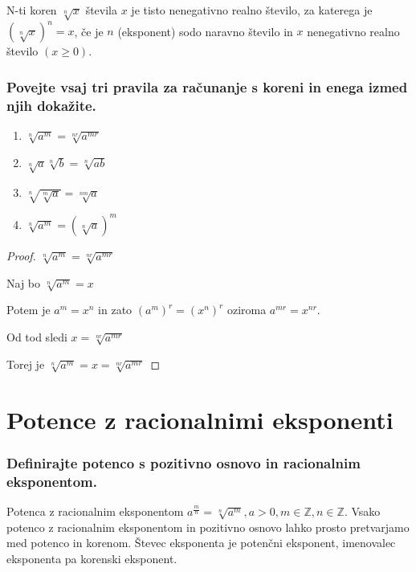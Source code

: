 \documentclass{article}
\begin{document}
N-ti koren $\sqrt[n]{x}$ števila $x$ je tisto nenegativno realno število, za katerega je $(\sqrt[n]{x})^{n}=x$, če je $n$ (eksponent) sodo naravno število in $x$ nenegativno realno število $(x \geq 0)$.

\subsubsection*{Povejte vsaj tri pravila za računanje s koreni in enega izmed njih dokažite.}

\begin{enumerate}
  \item $\sqrt[n]{a^{m}}=\sqrt[n r]{a^{m r}}$

  \item $\sqrt[n]{a} \sqrt[n]{b}=\sqrt[n]{a b}$

  \item $\sqrt[n]{\sqrt[m]{a}}=\sqrt[n m]{a}$

  \item $\sqrt[n]{a^{m}}=(\sqrt[n]{a})^{m}$

\end{enumerate}

\begin{proof}
    $\sqrt[n]{a^{m}}=\sqrt[n r]{a^{m r}}$

Naj bo $\sqrt[n]{a^{m}}=x$

Potem je $a^{m}=x^{n}$ in zato $\left(a^{m}\right)^{r}=\left(x^{n}\right)^{r}$ oziroma $a^{m r}=x^{n r}$.

Od tod sledi $x=\sqrt[n r]{a^{m r}}$

Torej je $\sqrt[n]{a^{m}}=x=\sqrt[n r]{a^{m r}}$

\end{proof}

\section{Potence z racionalnimi eksponenti}
\subsubsection*{Definirajte potenco s pozitivno osnovo in racionalnim eksponentom.}

Potenca z racionalnim eksponentom $a^{\frac{m}{n}} = \sqrt[n]{a^m}, a > 0, m \in \mathbb{Z}, n \in \mathbb{Z}$. Vsako potenco z racionalnim eksponentom in pozitivno osnovo lahko prosto pretvarjamo med potenco in korenom. Števec eksponenta je potenčni eksponent, imenovalec eksponenta pa korenski eksponent.
\end{document}
